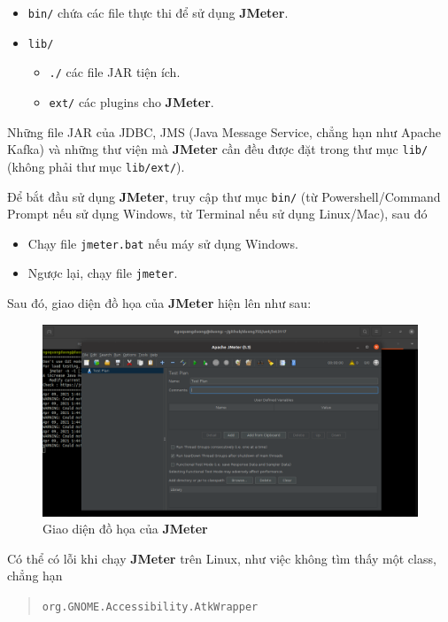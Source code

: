 \documentclass[10pt]{report}
\newcommand{\jmeter}{\textbf{JMeter}}
\begin{document}
\begin{itemize}[itemsep=0pt]
  \item \texttt{bin/} chứa các file thực thi để sử dụng \jmeter{}.
  \item \texttt{lib/}
      \begin{itemize}[itemsep=0pt]
          \item \texttt{./} các file JAR tiện ích.
          \item \texttt{ext/} các plugins cho \jmeter{}.
      \end{itemize}
\end{itemize}

\par Những file JAR của JDBC, JMS (Java Message Service, chẳng hạn như Apache Kafka) và những thư viện mà \jmeter{} cần đều được đặt trong thư mục \texttt{lib/} (không phải thư mục \texttt{lib/ext/}).

\par Để bắt đầu sử dụng \jmeter{}, truy cập thư mục \texttt{bin/} (từ Powershell/Command Prompt nếu sử dụng Windows, từ Terminal nếu sử dụng Linux/Mac), sau đó
\begin{itemize}[itemsep=0pt]
  \item Chạy file \texttt{jmeter.bat} nếu máy sử dụng Windows.
  \item Ngược lại, chạy file \texttt{jmeter}.
\end{itemize}

\par Sau đó, giao diện đồ họa của \jmeter{} hiện lên như sau:

\FloatBarrier{}
\begin{figure}[htp]
  \centering
  \includegraphics[scale=0.33]{jmeter-gui.png}
  \caption{Giao diện đồ họa của \jmeter{}}
\end{figure}
\FloatBarrier{}

\par Có thể có lỗi khi chạy \jmeter{} trên Linux, như việc không tìm thấy một class, chẳng hạn
\begin{quotation}
\texttt{org.GNOME.Accessibility.AtkWrapper}
\end{quotation}
\end{document}
